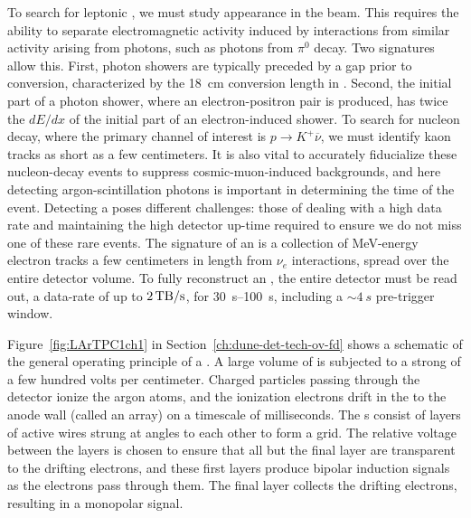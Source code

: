 To search for leptonic , we must study \nue appearance in the  \numu beam. This requires the ability to separate electromagnetic activity induced by  \nue interactions from similar activity arising from photons, such as photons from $\pi^{0}$ decay. Two signatures allow this. First, photon showers are typically preceded by a gap prior to conversion, characterized by the \SI{18}{cm} conversion length in . Second, the initial part of a photon shower, where an electron-positron pair is produced, has twice the $dE/dx$ of the initial part of an electron-induced shower. To search for nucleon decay, where the primary channel of interest is $p\rightarrow K^{+}\overline{\nu}$, we must identify kaon tracks as short as a few centimeters. It is also vital to accurately fiducialize these nucleon-decay events to suppress cosmic-muon-induced backgrounds, and here detecting argon-scintillation photons is important in determining the time of the event. Detecting a  poses different challenges: those of dealing with a high data rate and maintaining the high detector up-time required to ensure we do not miss one of these rare events. The signature of an  is a collection of MeV-energy electron tracks a few centimeters in length from  $\nu_{e}$ interactions, spread over the entire detector volume. To fully reconstruct an , the entire detector must be read out, a data-rate of up to $\SI{2}{\tera\byte/\second}$, for \SIrange{30}{100}{s}, including a $\sim\!\SI{4}{s}$ pre-trigger window.



Figure~\ref{fig:LArTPC1ch1} in Section~\ref{ch:dune-det-tech-ov-fd} shows a schematic of the general operating principle of a  . A large volume of  is subjected to a strong \efield of a few hundred volts per centimeter. Charged particles passing through the detector ionize the argon atoms, and the ionization electrons drift in the \efield to the anode wall (called an  array) on a timescale of milliseconds. 
The  s consist of layers of active wires strung at angles to each other to form a grid. The relative voltage between the layers is chosen to ensure that all but the final layer are transparent to the drifting electrons, and these first layers produce bipolar induction signals as the electrons pass through them. The final layer collects the drifting electrons, resulting in a monopolar signal.


